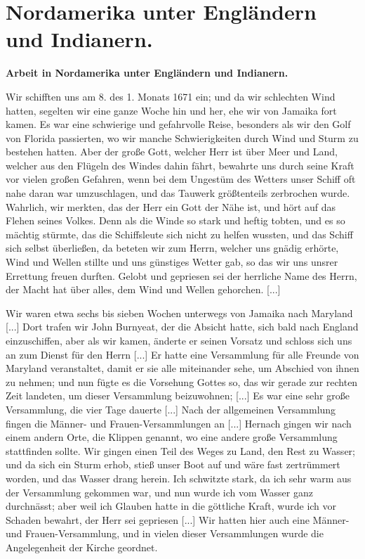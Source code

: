 

\chapter[Nordamerika unter Engländern und Indianern.]{Nordamerika unter Engländern und Indianern.}

\begin{center}
\textbf{Arbeit in Nordamerika unter Engländern und Indianern.}
\end{center}


Wir schifften uns am 8. des 1. Monats 1671 ein; und da
wir schlechten Wind hatten, segelten wir eine ganze Woche hin
und her, ehe wir von Jamaika fort kamen. Es war eine 
schwierige und gefahrvolle Reise, besonders als wir den Golf von
Florida passierten, wo wir manche Schwierigkeiten durch Wind
und Sturm zu bestehen hatten. Aber der große Gott, welcher
Herr ist über Meer und Land, welcher aus den Flügeln des
Windes dahin fährt, bewahrte uns durch seine Kraft vor vielen
großen Gefahren, wenn bei dem Ungestüm des Wetters unser
Schiff oft nahe daran war umzuschlagen, und das Tauwerk 
größtenteils zerbrochen wurde. Wahrlich, wir merkten, das der Herr ein
Gott der Nähe ist, und hört auf das Flehen seines Volkes. Denn
als die Winde so stark und heftig tobten, und es so mächtig
stürmte, das die Schiffsleute sich nicht zu helfen wussten, und
das Schiff sich selbst überließen, da beteten wir zum Herrn, welcher
uns gnädig erhörte, Wind und Wellen stillte und uns günstiges
Wetter gab, so das wir uns unsrer Errettung freuen durften.
Gelobt und gepriesen sei der herrliche Name des Herrn, der
Macht hat über alles, dem Wind und Wellen gehorchen. [...]

Wir waren etwa sechs bis sieben Wochen unterwegs von
Jamaika nach Maryland [...] Dort trafen wir John Burnyeat,
der die Absicht hatte, sich bald nach England einzuschiffen, aber
als wir kamen, änderte er seinen Vorsatz und schloss sich uns an
zum Dienst für den Herrn [...] Er hatte eine Versammlung für
alle Freunde von Maryland veranstaltet, damit er sie alle 
miteinander sehe, um Abschied von ihnen zu nehmen; und nun
fügte es die Vorsehung Gottes so, 
das wir gerade zur rechten
Zeit landeten, um dieser Versammlung beizuwohnen; [...] Es
war eine sehr große Versammlung, die vier Tage dauerte [...]
Nach der allgemeinen Versammlung fingen die Männer- und
Frauen-Versammlungen an [...] Hernach gingen wir nach einem
andern Orte, die Klippen genannt, wo eine andere große 
Versammlung stattfinden sollte. Wir gingen einen Teil des Weges
zu Land, den Rest zu Wasser; und da sich ein Sturm erhob, stieß
unser Boot auf und wäre fast zertrümmert worden, und das
Wasser drang herein. Ich schwitzte stark, da ich sehr warm aus
der Versammlung gekommen war, und nun wurde ich vom Wasser
ganz durchnässt; aber weil ich Glauben hatte in die göttliche Kraft,
wurde ich vor Schaden bewahrt, der Herr sei gepriesen [...]
Wir hatten hier auch eine Männer- und Frauen-Versammlung,
und in vielen dieser Versammlungen wurde die Angelegenheit der
Kirche geordnet.

